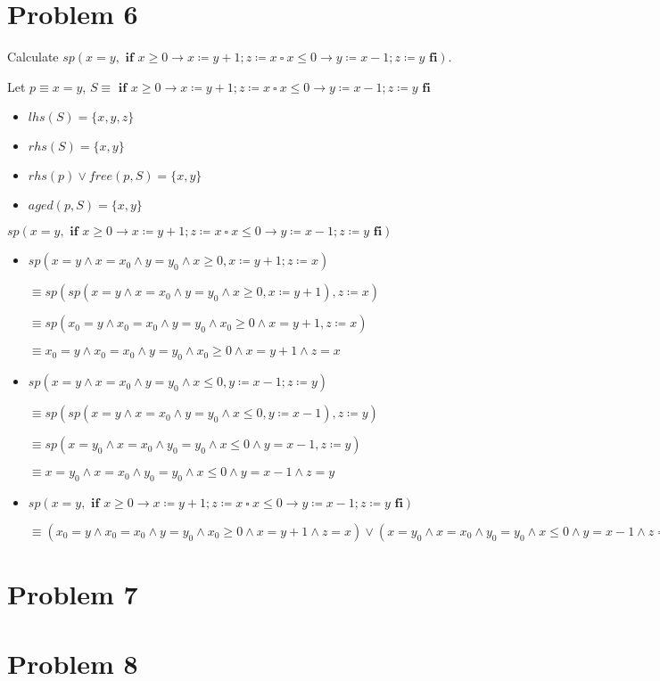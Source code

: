 \documentclass{article}
\begin{document}
\section*{Problem 6}

Calculate $ sp(x=y, \textbf{ if } x \geq 0 \rightarrow x \coloneqq y+1; z \coloneqq x  \ \square \ x \leq 0 \rightarrow y \coloneqq x-1; z \coloneqq y \textbf{ fi}) $.
\vspace{10pt}

Let $p \equiv x=y$, $ S \equiv \textbf{ if } x \geq 0 \rightarrow x \coloneqq y+1; z \coloneqq x  \ \square \ x \leq 0 \rightarrow y \coloneqq x-1; z \coloneqq y \textbf{ fi} $

\begin{itemize}
\item $lhs(S)=\{x,y,z\}$
\item $rhs(S)=\{x,y\}$
\item $rhs(p) \vee free(p,S)=\{x,y\}$
\item $aged(p,S)=\{x,y\}$
\end{itemize}


$ sp(x=y, \textbf{ if } x \geq 0 \rightarrow x \coloneqq y+1; z \coloneqq x  \ \square \ x \leq 0 \rightarrow y \coloneqq x-1; z \coloneqq y \textbf{ fi}) $

\begin{itemize}
    \item $sp(x=y \wedge x=x_0 \wedge y=y_0 \wedge x \geq 0, x \coloneqq y+1; z \coloneqq x)$

\qquad \qquad \qquad  $ \equiv sp(sp(x=y \wedge x=x_0 \wedge y=y_0 \wedge x \geq 0, x \coloneqq y+1), z \coloneqq x)$

\qquad \qquad \qquad  $ \equiv sp(x_0=y \wedge x_0=x_0 \wedge y=y_0 \wedge x_0 \geq 0 \wedge x = y+1, z \coloneqq x)$

\qquad \qquad \qquad  $ \equiv x_0=y \wedge x_0=x_0 \wedge y=y_0 \wedge x_0 \geq 0 \wedge x = y+1 \wedge z = x$

    \item $sp(x=y \wedge x=x_0 \wedge y=y_0 \wedge x \leq 0, y \coloneqq x-1; z \coloneqq y)$

\qquad \qquad \qquad  $ \equiv sp(sp(x=y \wedge x=x_0 \wedge y=y_0 \wedge x \leq 0, y \coloneqq x-1), z \coloneqq y)$

\qquad \qquad \qquad  $ \equiv sp(x=y_0 \wedge x=x_0 \wedge y_0=y_0 \wedge x \leq 0 \wedge y = x-1, z \coloneqq y)$

\qquad \qquad \qquad  $ \equiv x=y_0 \wedge x=x_0 \wedge y_0=y_0 \wedge x \leq 0 \wedge y = x-1 \wedge z = y$

    \item $ sp(x=y, \textbf{ if } x \geq 0 \rightarrow x \coloneqq y+1; z \coloneqq x  \ \square \ x \leq 0 \rightarrow y \coloneqq x-1; z \coloneqq y \textbf{ fi}) $

\qquad \qquad \qquad  $\equiv (x_0=y \wedge x_0=x_0 \wedge y=y_0 \wedge x_0 \geq 0 \wedge x = y+1 \wedge z = x) \vee (x=y_0 \wedge x=x_0 \wedge y_0=y_0 \wedge x \leq 0 \wedge y = x-1 \wedge z = y)$

\end{itemize}


\section*{Problem 7}


\section*{Problem 8}
\end{document}
